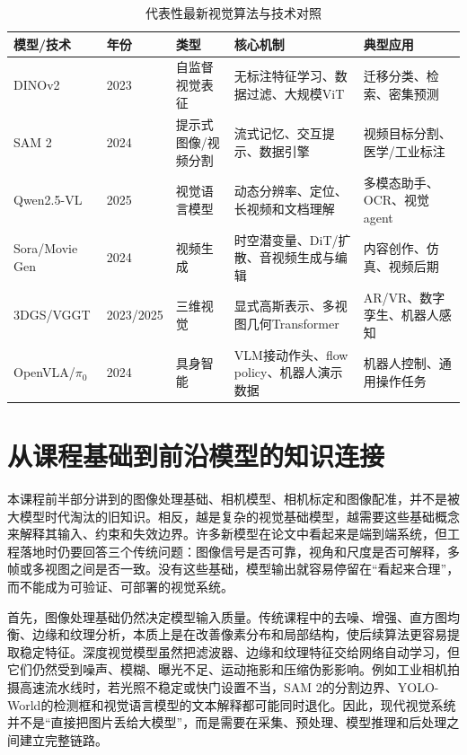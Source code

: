 \documentclass[UTF8,a4paper,12pt]{ctexart}
\newcommand{\model}[1]{\textsf{#1}}
\begin{document}
\begin{table}[htbp]
\centering
\small
\caption{代表性最新视觉算法与技术对照}
\begin{tabularx}{\textwidth}{C{2.45cm}C{1.75cm}C{2.05cm}Y Y}
\toprule
\textbf{模型/技术} & \textbf{年份} & \textbf{类型} & \textbf{核心机制} & \textbf{典型应用} \\
\midrule
\model{DINOv2} & 2023 & 自监督视觉表征 & 无标注特征学习、数据过滤、大规模ViT & 迁移分类、检索、密集预测 \\
\model{SAM 2} & 2024 & 提示式图像/视频分割 & 流式记忆、交互提示、数据引擎 & 视频目标分割、医学/工业标注 \\
\model{Qwen2.5-VL} & 2025 & 视觉语言模型 & 动态分辨率、定位、长视频和文档理解 & 多模态助手、OCR、视觉agent \\
\model{Sora}/\model{Movie Gen} & 2024 & 视频生成 & 时空潜变量、DiT/扩散、音视频生成与编辑 & 内容创作、仿真、视频后期 \\
\model{3DGS}/\model{VGGT} & 2023/2025 & 三维视觉 & 显式高斯表示、多视图几何Transformer & AR/VR、数字孪生、机器人感知 \\
\model{OpenVLA}/$\pi_0$ & 2024 & 具身智能 & VLM接动作头、flow policy、机器人演示数据 & 机器人控制、通用操作任务 \\
\bottomrule
\end{tabularx}
\end{table}

\section{从课程基础到前沿模型的知识连接}
本课程前半部分讲到的图像处理基础、相机模型、相机标定和图像配准，并不是被大模型时代淘汰的旧知识。相反，越是复杂的视觉基础模型，越需要这些基础概念来解释其输入、约束和失效边界。许多新模型在论文中看起来是端到端系统，但工程落地时仍要回答三个传统问题：图像信号是否可靠，视角和尺度是否可解释，多帧或多视图之间是否一致。没有这些基础，模型输出就容易停留在“看起来合理”，而不能成为可验证、可部署的视觉系统。

首先，图像处理基础仍然决定模型输入质量。传统课程中的去噪、增强、直方图均衡、边缘和纹理分析，本质上是在改善像素分布和局部结构，使后续算法更容易提取稳定特征。深度视觉模型虽然把滤波器、边缘和纹理特征交给网络自动学习，但它们仍然受到噪声、模糊、曝光不足、运动拖影和压缩伪影影响。例如工业相机拍摄高速流水线时，若光照不稳定或快门设置不当，\model{SAM 2}的分割边界、\model{YOLO-World}的检测框和视觉语言模型的文本解释都可能同时退化。因此，现代视觉系统并不是“直接把图片丢给大模型”，而是需要在采集、预处理、模型推理和后处理之间建立完整链路。
\end{document}
